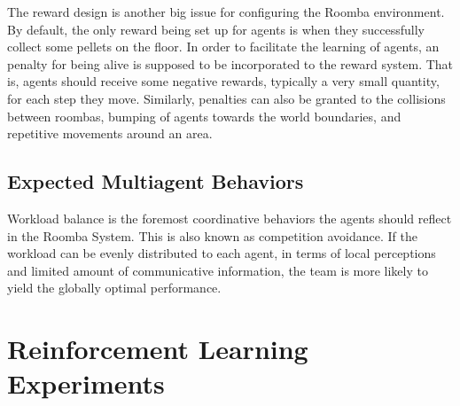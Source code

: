 \documentclass[conference]{IEEEtran}
\begin{document}
The reward design is another big issue for
configuring the Roomba environment. By default, the only reward being set up
for agents is when they successfully collect some pellets on the floor. In
order to facilitate the learning of agents, an penalty for being alive is
supposed to be incorporated to the reward system. That is, agents should
receive some negative rewards, typically a very small quantity, for each step
they move. Similarly, penalties can also be granted to the collisions between
roombas, bumping of agents towards the world boundaries, and repetitive
movements around an area.

\subsection{Expected Multiagent Behaviors}

Workload balance is the foremost coordinative behaviors the
agents should reflect in the Roomba System. This is also known as competition
avoidance. If the workload can be evenly distributed to each agent, in terms of
local perceptions and limited amount of communicative information, the team is
more likely to yield the globally optimal performance.


%
%
%

\section{Reinforcement Learning Experiments}
\label{section:rlexpo} 
\end{document}
